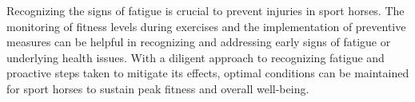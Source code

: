 Recognizing the signs of fatigue is crucial to prevent injuries in sport horses. The monitoring of fitness levels during exercises and the implementation of preventive measures can be helpful in recognizing and addressing early signs of fatigue or underlying health issues. With a diligent approach to recognizing fatigue and proactive steps taken to mitigate its effects, optimal conditions can be maintained for sport horses to sustain peak fitness and overall well-being.







